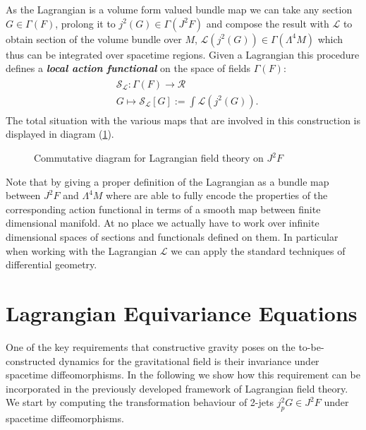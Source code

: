 \documentclass[a4paper,12pt, DIV=14, BCOR=5mm, twoside, headsepline]{scrbook}
\begin{document}
As the Lagrangian is a volume form valued bundle map we can take any section $G \in \Gamma(F)$, prolong it to $j^2(G) \in \Gamma(J^2F)$ and compose the result with $\mathcal{L}$ to obtain section of the volume bundle over $M$, $\mathcal{L}(j^2(G)) \in \Gamma(\Lambda^4M)$ which thus can be integrated over spacetime regions. Given a Lagrangian this procedure defines a \textit{\textbf{local action functional}} on the space of fields $\Gamma(F)$:
\begin{align}
\begin{aligned}
    &\mathcal{S}_{\mathcal{L}} : \Gamma(F) \longrightarrow \mathcal{R} \\
    &G \longmapsto \mathcal{S}_{\mathcal{L}}[G] := \int \mathcal{L}(j^2(G)).
\end{aligned}
\end{align}
The total situation with the various maps that are involved in this construction is displayed in diagram (\ref{diagram1}). 
\begin{figure}[ht]
\centering
{}
\caption{Commutative diagram for Lagrangian field theory on $J^2F$} \label{diagram1}
\end{figure}
Note that by giving a proper definition of the Lagrangian as a bundle map between $J^2F$ and $\Lambda^4M$ where are able to fully encode the properties of the corresponding action functional in terms of a smooth map between finite dimensional manifold. At no place we actually have to work over infinite dimensional spaces of sections and functionals defined on them. In particular when working with the Lagrangian $\mathcal{L}$ we can apply the standard techniques of differential geometry. 
\section{Lagrangian Equivariance Equations}
One of the key requirements that constructive gravity poses on the to-be-constructed dynamics for the gravitational field is their invariance under spacetime diffeomorphisms. In the following we show how this requirement can be incorporated in the previously developed framework of Lagrangian field theory. We start by computing the transformation behaviour of 2-jets $j_p^2G \in J^2F$ under spacetime diffeomorphisms.
\end{document}
